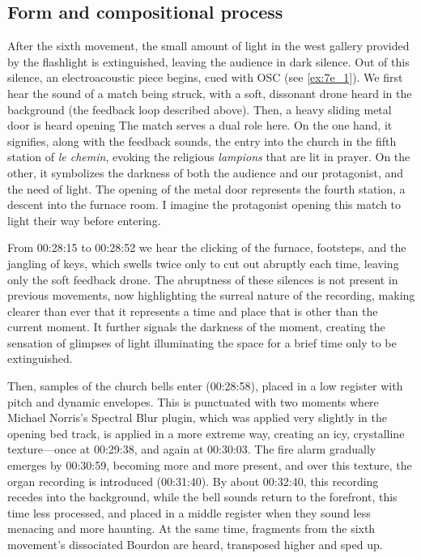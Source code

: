 \documentclass[12pt,twoside,maitrise]{dms_ks}
\theoremstyle{definition}
\begin{document}
{{\subsection{Form and compositional process}

After the sixth movement, the small amount of light in the west gallery provided by the flashlight is extinguished, leaving the audience in dark silence. 
Out of this silence, an electroacoustic piece begins, cued with OSC (see \cref{ex:7e_1}). 
We first hear the sound of a match being struck, with a soft, dissonant drone heard in the background (the feedback loop described above). 
Then, a heavy sliding metal door is heard opening
The match serves a dual role here.
On the one hand, it signifies, along with the feedback sounds, the entry into the church in the fifth station of \textit{le chemin}, evoking the religious \textit{lampions} that are lit in prayer.
On the other, it symbolizes the darkness of both the audience and our protagonist, and the need of light.
The opening of the metal door represents the fourth station, a descent into the furnace room.
I imagine the protagonist opening this match to light their way before entering.

From 00:28:15 to 00:28:52 we hear the clicking of the furnace, footsteps, and the jangling of keys, which swells twice only to cut out abruptly each time, leaving only the soft feedback drone. 
The abruptness of these silences is not present in previous movements, now highlighting the surreal nature of the recording, making clearer than ever that it represents a time and place that is other than the current moment. 
It further signals the darkness of the moment, creating the sensation of glimpses of light illuminating the space for a brief time only to be extinguished. 

Then, samples of the church bells enter (00:28:58), placed in a low register with pitch and dynamic envelopes. 
This is punctuated with two moments where Michael Norris's Spectral Blur plugin, which was applied very slightly in the opening bed track, is applied in a more extreme way, creating an icy, crystalline texture---once at 00:29:38, and again at 00:30:03. 
The fire alarm gradually emerges by 00:30:59, becoming more and more present, and over this texture, the organ recording is introduced (00:31:40). 
By about 00:32:40, this recording recedes into the background, while the bell sounds return to the forefront, this time less processed, and placed in a middle register when they sound less menacing and more haunting. 
At the same time, fragments from the sixth movement's dissociated Bourdon are heard, transposed higher and sped up.

}}
\end{document}
